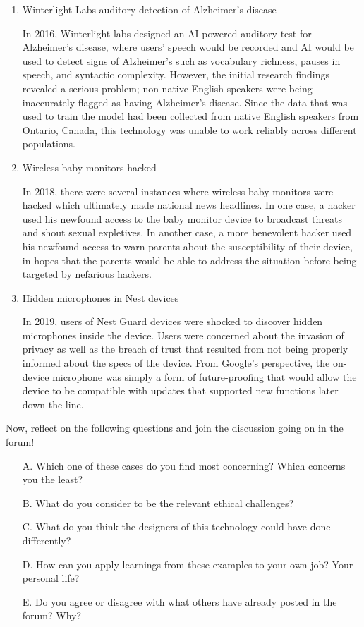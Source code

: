 \begin{enumerate}
    \item  Winterlight Labs auditory detection of Alzheimer’s disease
    
    In 2016, Winterlight labs designed an AI-powered auditory test for Alzheimer’s disease, where users’ speech would be recorded and AI would be used to detect signs of Alzheimer’s such as vocabulary richness, pauses in speech, and syntactic complexity. However, the initial research findings revealed a serious problem; non-native English speakers were being inaccurately flagged as having Alzheimer’s disease. Since the data that was used to train the model had been collected from native English speakers from Ontario, Canada, this technology was unable to work reliably across different populations. 
    
    \item  Wireless baby monitors hacked
    
    In 2018, there were several instances where wireless baby monitors were hacked which ultimately made national news headlines. In one case, a hacker used his newfound access to the baby monitor device to broadcast threats and shout sexual expletives. In another case, a more benevolent hacker used his newfound access to warn parents about the susceptibility of their device, in hopes that the parents would be able to address the situation before being targeted by nefarious hackers. 
    
    \item  Hidden microphones in Nest devices
    
    In 2019, users of Nest Guard devices were shocked to discover hidden microphones inside the device. Users were concerned about the invasion of privacy as well as the breach of trust that resulted from not being properly informed about the specs of the device. From Google’s perspective, the on-device microphone was simply a form of future-proofing that would allow the device to be compatible with updates that supported new functions later down the line.
    
\end{enumerate}

Now, reflect on the following questions and join the discussion going on in the forum!

\begin{itemize}
    \item [A.] Which one of these cases do you find most concerning? Which concerns you the least?
    \item [B.] What do you consider to be the relevant ethical challenges? 
    \item [C.] What do you think the designers of this technology could have done differently?
    \item [D.] How can you apply learnings from these examples to your own job? Your personal life?
    \item [E.] Do you agree or disagree with what others have already posted in the forum? Why?
\end{itemize}
